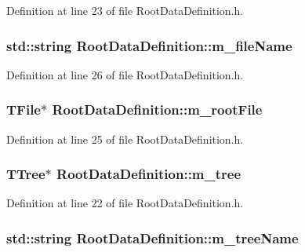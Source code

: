 Definition at line 23 of file Root\+Data\+Definition.\+h.

\hypertarget{classRootDataDefinition_a03154139db8613ec02cd57fd84d8c0e8}{
\subsubsection[{m\+\_\+file\+Name}]{\setlength{\rightskip}{0pt plus 5cm}std\+::string Root\+Data\+Definition\+::m\+\_\+file\+Name\hspace{0.3cm}{\ttfamily [protected]}}}\label{classRootDataDefinition_a03154139db8613ec02cd57fd84d8c0e8}


Definition at line 26 of file Root\+Data\+Definition.\+h.

\hypertarget{classRootDataDefinition_af00a892a1b940abf9265066391b67304}{
\subsubsection[{m\+\_\+root\+File}]{\setlength{\rightskip}{0pt plus 5cm}T\+File$\ast$ Root\+Data\+Definition\+::m\+\_\+root\+File\hspace{0.3cm}{\ttfamily [protected]}}}\label{classRootDataDefinition_af00a892a1b940abf9265066391b67304}


Definition at line 25 of file Root\+Data\+Definition.\+h.

\hypertarget{classRootDataDefinition_a941ec585a2aa533bc30889a382e54f50}{
\subsubsection[{m\+\_\+tree}]{\setlength{\rightskip}{0pt plus 5cm}T\+Tree$\ast$ Root\+Data\+Definition\+::m\+\_\+tree\hspace{0.3cm}{\ttfamily [protected]}}}\label{classRootDataDefinition_a941ec585a2aa533bc30889a382e54f50}


Definition at line 22 of file Root\+Data\+Definition.\+h.

\hypertarget{classRootDataDefinition_a46394bbb1863baa4abcd8cbd0413fa88}{
\subsubsection[{m\+\_\+tree\+Name}]{\setlength{\rightskip}{0pt plus 5cm}std\+::string Root\+Data\+Definition\+::m\+\_\+tree\+Name\hspace{0.3cm}{\ttfamily [protected]}}}\label{classRootDataDefinition_a46394bbb1863baa4abcd8cbd0413fa88}


